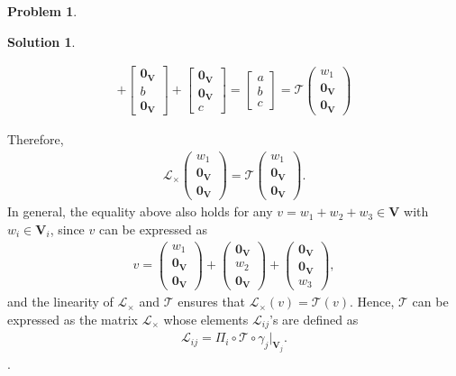 \documentclass{article}
\theoremstyle{definition}
\newtheorem*{prob*}{Problem}
\newtheorem*{sln*}{Solution}
\newcommand{\V}{\mathbf{V}}
\newcommand{\lag}{\mathcal{L}}
\newcommand{\T}{\mathcal{T}}
\begin{document}
\begin{prob*}
\begin{sln*}
\begin{enumerate}
\begin{enumerate}
\begin{align*}
			 +
			 \begin{bmatrix}
			 \mathbf{0}_\V\\
			 b\\
			 \mathbf{0}_\V
			 \end{bmatrix} 
			 + 
			 \begin{bmatrix}
			 \mathbf{0}_\V\\
			 \mathbf{0}_\V\\
			 c
			 \end{bmatrix} = \begin{bmatrix}
			 a\\b\\c
			 \end{bmatrix} = \T\begin{pmatrix}
			 w_1\\\mathbf{0}_\V\\\mathbf{0}_\V
			 \end{pmatrix}
			\end{align*}

			Therefore,
			\begin{align*}
			\lag_\times\begin{pmatrix}
			w_1\\\mathbf{0}_\V \\ \mathbf{0}_\V
			\end{pmatrix} = \T\begin{pmatrix}
			w_1\\\mathbf{0}_\V \\ \mathbf{0}_\V
			\end{pmatrix}.
			\end{align*}
			In general, the equality above also holds for any $v = w_1 + w_2 + w_3 \in \V$ with $w_i \in \V_i$, since $v$ can be expressed as
			\begin{align*}
			v = \begin{pmatrix}
			w_1\\\mathbf{0}_\V \\ \mathbf{0}_\V
			\end{pmatrix} + \begin{pmatrix}
			\mathbf{0}_\V\\ w_2\\ \mathbf{0}_\V
			\end{pmatrix} + \begin{pmatrix}
			\mathbf{0}_\V\\\mathbf{0}_\V \\ w_3
			\end{pmatrix},
			\end{align*}
			and the linearity of $\lag_\times$ and $\T$ ensures that $\lag_\times(v) = \T(v)$. Hence, $\T$ can be expressed as the matrix $\lag_\times$ whose elements $\lag_{ij}$'s are defined as
			\begin{align*}
			\lag_{ij} = \Pi_i \circ \T \circ \gamma_j\bigg\vert_{\V_j}.
			\end{align*}.


\end{enumerate}
\end{enumerate}
\end{sln*}
\end{prob*}
\end{document}
